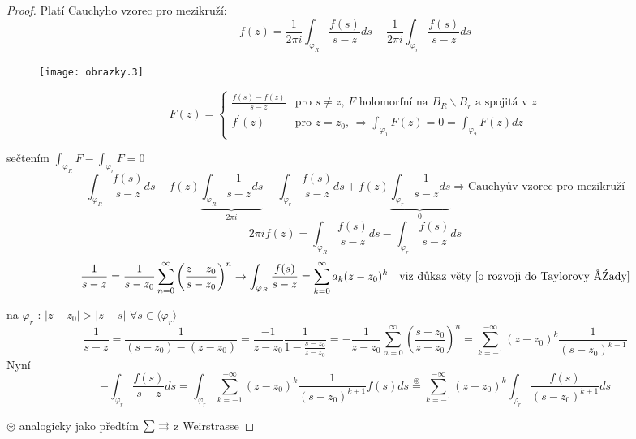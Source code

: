 \begin{proof}
Platí Cauchyho vzorec pro mezikruží:
$$f(z) = \frac{1}{2 \pi i} \int_{\varphi_R} \frac{f(s)}{s-z} ds - \frac{1}{2 \pi i} \int_{\varphi_r} \frac{f(s)}{s-z} ds$$

\begin{figure}[!h] \begin{center}
\texttt{[image: obrazky.3]}
\end{center} \end{figure}

\begin{equation*}
F(z) = \left\{ \begin{array}{ll}
 \frac{f(s)-f(z)}{s-z} & \textrm{pro $s \neq z$, $F$ holomorfní na $B_R \backslash B_r$ a spojitá v $z$} \\
 f^\prime(z) & \textrm{pro $z=z_0$, $\Rightarrow \int_{\varphi_1} F(z) = 0 = \int_{\varphi_2} F(z) dz$}
  \end{array} \right.
\end{equation*}

sečtením $\int_{\varphi_R} F - \int_{\varphi_r} F = 0$
$$\int_{\varphi_R} \frac{f(s)}{s-z} ds - f(z) \underbrace{\int_{\varphi_R} \frac{1}{s-z} ds}_{2 \pi i} - \int_{\varphi_r} \frac{f(s)}{s-z} ds + f(z) \underbrace{\int_{\varphi_r} \frac{1}{s-z} ds}_{0} \Rightarrow \textrm{Cauchyův vzorec pro mezikruží}$$
$$2 \pi i f(z) = \int_{\varphi_R} \frac{f(s)}{s-z} ds - \int_{\varphi_r} \frac{f(s)}{s-z} ds$$
$$\frac{1}{s-z} = \frac{1}{s-z_0} \sum_{n=0}^\infty \left( \frac{z-z_0}{s-z_0} \right)^n \to \int_{\varphi_R} \frac{f(s)}{s-z} = \sum_{k=0}^\infty a_k (z-z_0)^k \quad \textrm{viz důkaz věty \ref{o rozvoji do Taylorovy řady}}$$

na $\varphi_r$ : $|z-z_0| > |z-s|$ $\forall s \in \langle \varphi_r \rangle$
$$\frac{1}{s-z} = \frac{1}{(s-z_0)-(z-z_0)} = \frac{-1}{z-z_0} \frac{1}{1 - \frac{s-z_0}{z-z_0}} = - \frac{1}{z-z_0} \sum_{n=0}^\infty \left( \frac{s-z_0}{z-z_0} \right)^n = \sum_{k=-1}^{-\infty} (z-z_0)^k \frac{1}{(s-z_0)^{k+1}}$$
Nyní
$$- \int_{\varphi_r} \frac{f(s)}{s-z} ds = \int_{\varphi_r} \sum_{k=-1}^{-\infty} (z-z_0)^k \frac{1}{(s-z_0)^{k+1}} f(s) ds \overset{\circledast}{=} \sum_{k=-1}^{-\infty} (z-z_0)^{k} \int_{\varphi_r} \frac{f(s)}{(s-z_0)^{k+1}} ds$$

$\circledast$ analogicky jako předtím $\sum \rightrightarrows$ z Weirstrasse
\end{proof}
